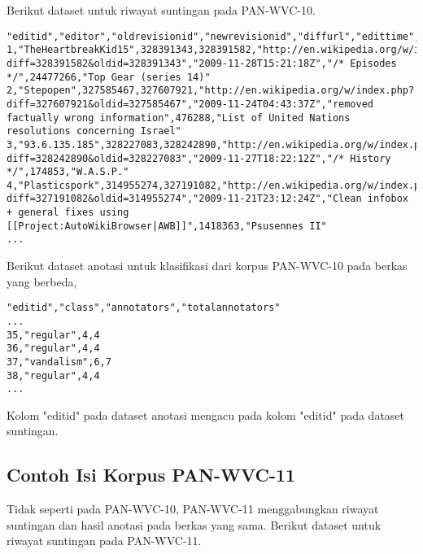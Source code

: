 Berikut dataset untuk riwayat suntingan pada PAN-WVC-10.

\begin{lstlisting}
"editid","editor","oldrevisionid","newrevisionid","diffurl","edittime","editcomment","articleid","articletitle"
1,"TheHeartbreakKid15",328391343,328391582,"http://en.wikipedia.org/w/index.php?diff=328391582&oldid=328391343","2009-11-28T15:21:18Z","/* Episodes */",24477266,"Top Gear (series 14)"
2,"Stepopen",327585467,327607921,"http://en.wikipedia.org/w/index.php?diff=327607921&oldid=327585467","2009-11-24T04:43:37Z","removed factually wrong information",476288,"List of United Nations resolutions concerning Israel"
3,"93.6.135.185",328227083,328242890,"http://en.wikipedia.org/w/index.php?diff=328242890&oldid=328227083","2009-11-27T18:22:12Z","/* History */",174853,"W.A.S.P."
4,"Plasticspork",314955274,327191082,"http://en.wikipedia.org/w/index.php?diff=327191082&oldid=314955274","2009-11-21T23:12:24Z","Clean infobox + general fixes using [[Project:AutoWikiBrowser|AWB]]",1418363,"Psusennes II"
...
\end{lstlisting}

Berikut dataset anotasi untuk klasifikasi dari korpus PAN-WVC-10 pada berkas yang berbeda,

\begin{lstlisting}
"editid","class","annotators","totalannotators"
...
35,"regular",4,4
36,"regular",4,4
37,"vandalism",6,7
38,"regular",4,4
...
\end{lstlisting}

Kolom "editid" pada dataset anotasi mengacu pada kolom "editid" pada dataset suntingan.

\newpage
\subsection{Contoh Isi Korpus PAN-WVC-11}

Tidak seperti pada PAN-WVC-10, PAN-WVC-11 menggabungkan riwayat suntingan dan hasil anotasi pada berkas yang sama.
Berikut dataset untuk riwayat suntingan pada PAN-WVC-11.

